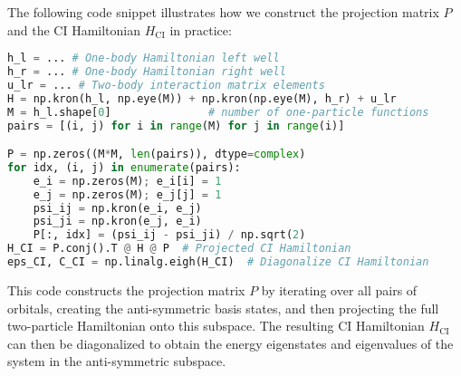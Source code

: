 \documentclass{subfiles}
\begin{document}
The following code snippet illustrates how we construct the projection matrix $P$ and the CI Hamiltonian $H_{\text{CI}}$ in practice:
\begin{lstlisting}[language=Python]
h_l = ... # One-body Hamiltonian left well
h_r = ... # One-body Hamiltonian right well
u_lr = ... # Two-body interaction matrix elements
H = np.kron(h_l, np.eye(M)) + np.kron(np.eye(M), h_r) + u_lr 
M = h_l.shape[0]               # number of one-particle functions
pairs = [(i, j) for i in range(M) for j in range(i)]

P = np.zeros((M*M, len(pairs)), dtype=complex)
for idx, (i, j) in enumerate(pairs):
    e_i = np.zeros(M); e_i[i] = 1
    e_j = np.zeros(M); e_j[j] = 1
    psi_ij = np.kron(e_i, e_j)
    psi_ji = np.kron(e_j, e_i)
    P[:, idx] = (psi_ij - psi_ji) / np.sqrt(2)
H_CI = P.conj().T @ H @ P  # Projected CI Hamiltonian
eps_CI, C_CI = np.linalg.eigh(H_CI)  # Diagonalize CI Hamiltonian
\end{lstlisting}
This code constructs the projection matrix $P$ by iterating over all pairs of orbitals, creating the anti-symmetric basis states, and then projecting the full two-particle Hamiltonian onto this subspace. The resulting CI Hamiltonian $H_{\text{CI}}$ can then be diagonalized to obtain the energy eigenstates and eigenvalues of the system in the anti-symmetric subspace.
\end{document}
